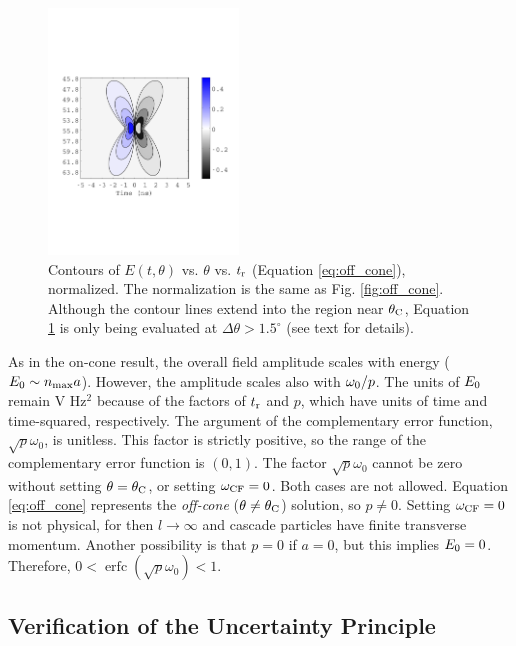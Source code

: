 \documentclass[amsmath,amssymb,aps,prd,10pt,twocolumn]{revtex4}
\DeclareMathOperator\erfc{erfc}
\begin{document}
\begin{figure}
\centering
\includegraphics[width=0.45\textwidth,trim=0cm 6cm 0cm 6cm,clip=true]{May5_plot3.pdf}
\caption{\label{fig:off_cone2} Contours of $E(t,\theta)$ vs. $\theta$ vs. $t_{\rm r}$ (Equation \ref{eq:off_cone}), normalized.  The normalization is the same as Fig. \ref{fig:off_cone}.  Although the contour lines extend into the region near $\theta_{\rm C}$, Equation \ref{fig:off_cone2} is only being evaluated at $\Delta \theta > 1.5^{\circ}$ (see text for details).}
\end{figure}

As in the on-cone result, the overall field amplitude scales with energy ($E_{\rm 0} \sim n_{\rm max} a$).  However, the amplitude scales also with $\omega_{\rm 0}/p$.  The units of $E_{\rm 0}$ remain V Hz$^2$ because of the factors of $t_{\rm r}$ and $p$, which have units of time and time-squared, respectively.  The argument of the complementary error function, $\sqrt{p}\omega_0$, is unitless.  This factor is strictly positive, so the range of the complementary error function is $(0,1)$.  The factor $\sqrt{p}\omega_0$ cannot be zero without setting $\theta = \theta_{\rm C}$, or setting $\omega_{\rm CF} = 0$.  Both cases are not allowed.  Equation \ref{eq:off_cone} represents the \textit{off-cone} ($\theta \neq \theta_{\rm C}$) solution, so $p \neq 0$.  Setting $\omega_{\rm CF} = 0$ is not physical, for then $l \to \infty$ and cascade particles have finite transverse momentum.  Another possibility is that $p = 0$ if $a = 0$, but this implies $E_{\rm 0}=0$.  Therefore, $0 < \erfc(\sqrt{p}\omega_0) < 1$.

\subsection{Verification of the Uncertainty Principle}
\label{sec:sigma}
\end{document}

